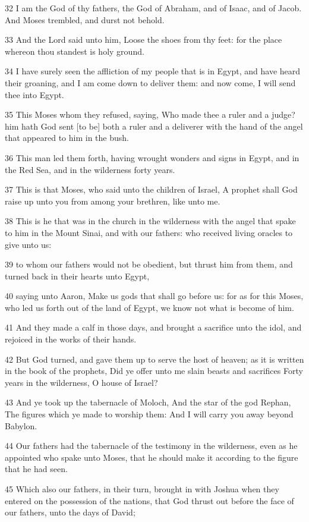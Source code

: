 \par 32 I am the God of thy fathers, the God of Abraham, and of Isaac, and of Jacob. And Moses trembled, and durst not behold.
\par 33 And the Lord said unto him, Loose the shoes from thy feet: for the place whereon thou standest is holy ground.
\par 34 I have surely seen the affliction of my people that is in Egypt, and have heard their groaning, and I am come down to deliver them: and now come, I will send thee into Egypt.
\par 35 This Moses whom they refused, saying, Who made thee a ruler and a judge? him hath God sent [to be] both a ruler and a deliverer with the hand of the angel that appeared to him in the bush.
\par 36 This man led them forth, having wrought wonders and signs in Egypt, and in the Red Sea, and in the wilderness forty years.
\par 37 This is that Moses, who said unto the children of Israel, A prophet shall God raise up unto you from among your brethren, like unto me.
\par 38 This is he that was in the church in the wilderness with the angel that spake to him in the Mount Sinai, and with our fathers: who received living oracles to give unto us:
\par 39 to whom our fathers would not be obedient, but thrust him from them, and turned back in their hearts unto Egypt,
\par 40 saying unto Aaron, Make us gods that shall go before us: for as for this Moses, who led us forth out of the land of Egypt, we know not what is become of him.
\par 41 And they made a calf in those days, and brought a sacrifice unto the idol, and rejoiced in the works of their hands.
\par 42 But God turned, and gave them up to serve the host of heaven; as it is written in the book of the prophets, Did ye offer unto me slain beasts and sacrifices Forty years in the wilderness, O house of Israel?
\par 43 And ye took up the tabernacle of Moloch, And the star of the god Rephan, The figures which ye made to worship them: And I will carry you away beyond Babylon.
\par 44 Our fathers had the tabernacle of the testimony in the wilderness, even as he appointed who spake unto Moses, that he should make it according to the figure that he had seen.
\par 45 Which also our fathers, in their turn, brought in with Joshua when they entered on the possession of the nations, that God thrust out before the face of our fathers, unto the days of David;
